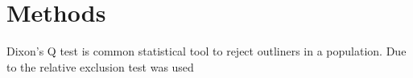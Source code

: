 \chapter{Methods}

Dixon's Q test is common statistical tool to reject outliners in a population. Due to the relative  exclusion test was used 